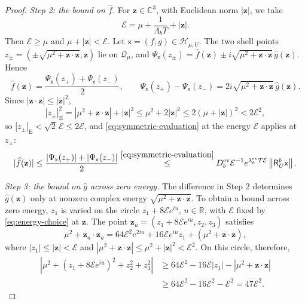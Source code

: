 \documentclass[11pt]{amsart}
\numberwithin{equation}{section}
\theoremstyle{definition}
\newcommand{\R}{\mathbb R}
\newcommand{\C}{\mathbb C}
\newcommand{\Hh}{\mathcal H}
\newcommand{\Res}{\mathsf R}
\newcommand{\sx}{\mathsf x}
\newcommand{\bz}{\mathbf z}
\newcommand{\Energy}{\mathcal E}
\newcommand{\norm}[1]{\left\|#1\right\|}
\newcommand{\wh}[1]{\widehat{#1}}
\begin{document}
\begin{proof}
\smallskip
\emph{Step 2: the bound on \(\wh f\).}
For \(\bz\in\C^3\), with Euclidean norm \(|\bz|\), we take
\begin{equation}
 \Energy=\mu+\frac1{\Lambda_bT}+|\bz|.
 \label{eq:energy-choice}
\end{equation}
Then \(\Energy\ge\mu\) and \(\mu+|\bz|<\Energy\). Let
\(\sx=(f,g)\in\Hh_{\mu,U}\). The two shell points
\(z_\pm=(\pm\sqrt{\mu^2+\bz\cdot\bz},\bz)\) lie on \(\mathcal Q_\mu\),
and \(\Psi_\sx(z_\pm)=\wh f(\bz)\pm i\sqrt{\mu^2+\bz\cdot\bz}\,\wh g(\bz)\).
Hence
\[
 \wh f(\bz)=\frac{\Psi_\sx(z_+)+\Psi_\sx(z_-)}2,\qquad
 \Psi_\sx(z_+)-\Psi_\sx(z_-)=2i\sqrt{\mu^2+\bz\cdot\bz}\,\wh g(\bz).
\]
Since \(|\bz\cdot\bz|\le|\bz|^2\),
\[
 |z_\pm|_{\mathrm E}^2
 =|\mu^2+\bz\cdot\bz|+|\bz|^2
 \le\mu^2+2|\bz|^2
 \le2(\mu+|\bz|)^2
 <2\Energy^2,
\]
so \(|z_\pm|_{\mathrm E}<\sqrt2\,\Energy\le2\Energy\), and
\eqref{eq:symmetric-evaluation} at the energy \(\Energy\) applies at
\(z_\pm\):
\[
 |\wh f(\bz)|
 \le\frac{|\Psi_\sx(z_+)|+|\Psi_\sx(z_-)|}2
 \overset{\eqref{eq:symmetric-evaluation}}{\le}
 D_b^{\mathrm{ev}}\Energy^{-1}e^{\lambda_b^{\mathrm{ev}}T\Energy}
 \norm{\Res_U^b\sx}.
\]

\smallskip
\emph{Step 3: the bound on \(\wh g\) across zero energy.}
The difference in Step 2 determines \(\wh g(\bz)\) only at nonzero
complex energy \(\sqrt{\mu^2+\bz\cdot\bz}\). To obtain a bound across
zero energy, \(z_1\) is varied on the circle \(z_1+8\Energy e^{iu}\),
\(u\in\R\), with \(\Energy\) fixed by \eqref{eq:energy-choice} at
\(\bz\). The point \(\bz_u=(z_1+8\Energy e^{iu},z_2,z_3)\) satisfies
\[
 \mu^2+\bz_u\cdot\bz_u
 =64\Energy^2e^{2iu}+16\Energy e^{iu}z_1+(\mu^2+\bz\cdot\bz),
\]
where \(|z_1|\le|\bz|<\Energy\) and
\(|\mu^2+\bz\cdot\bz|\le\mu^2+|\bz|^2<\Energy^2\). On this circle,
therefore,
\begin{align*}
 \left|\mu^2+(z_1+8\Energy e^{iu})^2+z_2^2+z_3^2\right|
 &\ge64\Energy^2-16\Energy|z_1|-|\mu^2+\bz\cdot\bz|\\
 &\ge64\Energy^2-16\Energy^2-\Energy^2=47\Energy^2.
\end{align*}


\end{proof}
\end{document}
